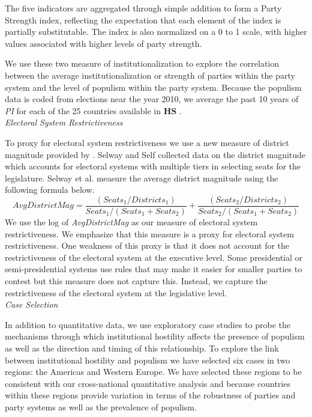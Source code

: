 \documentclass[a4paper,12pt]{article}\usepackage[]{graphicx}\usepackage[]{color}
\begin{document}
The five indicators are aggregated through simple addition to form a Party Strength index, reflecting the expectation that each element of the index is partially substitutable. The index is also normalized on a 0 to 1 scale, with higher values associated with higher levels of party strength.
\par
We use these two measure of institutionalization to explore the correlation between the average institutionalization or strength of parties within the party system and the level of populism within the party system. Because the populism data is coded from elections near the year 2010, we average the past 10 years of \textit{PI} for each of the 25 countries available in \textbf{HS} . 
\\
\noindent
\textit{Electoral System Restrictiveness}
\par
To proxy for electoral system restrictiveness we use a new measure of district magnitude provided by \cite{selway2016system}. Selway and Self collected data on the district magnitude which accounts for electoral systems with multiple tiers in selecting seats for the legislature. Selway et al. measure the average district magnitude using the following formula below. 
\[
Avg District Mag = \frac{(Seats_1/Districts_1)}{Seats_1/ (Seats_1 + Seats_2)}+\frac{(Seats_2/Districts_2)}{Seats_2/(Seats_1 + Seats_2)}
\]
We use the log of \textit{AvgDistrictMag} as our measure of electoral system restrictiveness. We emphasize that this measure is a proxy for electoral system restrictiveness. One weakness of this proxy is that it does not account for the restrictiveness of the electoral system at the executive level. Some presidential or semi-presidential systems use rules that may make it easier for smaller parties to contest but this measure does not capture this. Instead, we capture the restrictiveness of the electoral system at the legislative level. 
\\
\noindent
\textit{Case Selection}
\par
In addition to quantitative data, we use exploratory case studies to probe the mechanisms through which institutional hostility affects the presence of populism as well as the direction and timing of this relationship. To explore the link between institutional hostility and populism we have selected six cases in two regions: the Americas and Western Europe. We have selected these regions to be consistent with our cross-national quantitative analysis and because countries within these regions provide variation in terms of the robustness of parties and party systems as well as the prevalence of populism. %
\end{document}
